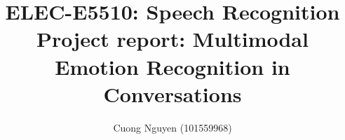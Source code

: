 \documentclass{article}
\title{ELEC-E5510: Speech Recognition\\
    \large Project report: Multimodal Emotion Recognition in Conversations}
\author{Cuong Nguyen (101559968)}
\newcommand{\inlinemaketitle}{{\let\newpage\relax\maketitle}}
\begin{document}
\inlinemaketitle
\tableofcontents


% 
% 









\printbibliography[heading=bibintoc]

\begin{appendices}
	
\end{appendices}
\end{document}
